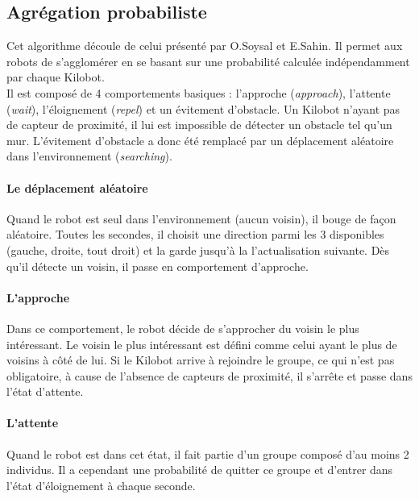 \documentclass[a4paper]{article}
\begin{document}
\subsection{Agrégation probabiliste}

Cet algorithme découle de celui présenté par O.Soysal et E.Sahin. \cite{soysal_probabilistic_2005} Il permet aux robots de s'agglomérer en se basant sur une probabilité calculée indépendamment par chaque Kilobot.\\

Il est composé de 4 comportements basiques : l'approche
(\textit{approach}), l'attente
(\textit{wait}), l'éloignement 
(\textit{repel}) et un évitement d'obstacle.
Un Kilobot n'ayant pas de capteur de proximité, il lui est impossible de détecter un obstacle tel qu'un mur. L'évitement d'obstacle a donc été remplacé par un déplacement aléatoire dans l'environnement (\textit{searching}).
\paragraph{Le déplacement aléatoire} Quand le robot est seul dans l'environnement (aucun voisin), il bouge de façon aléatoire. Toutes les secondes, il choisit une direction parmi les 3 disponibles (gauche, droite, tout droit) et la garde jusqu'à la l'actualisation suivante. Dès qu'il détecte un voisin, il passe en comportement d'approche.
\paragraph{L'approche}Dans ce comportement, le robot décide de s'approcher du voisin le plus intéressant. Le voisin le plus intéressant est défini comme celui ayant le plus de voisins à côté de lui. Si le Kilobot arrive à rejoindre le groupe, ce qui n'est pas obligatoire, à cause de l'absence de capteurs de proximité, il s'arrête et passe dans l'état d'attente.
\paragraph{L'attente} Quand le robot est dans cet état, il fait partie d'un groupe composé d'au moins 2 individus. Il a cependant une probabilité de quitter ce groupe et d'entrer dans l'état d'éloignement à chaque seconde.
\end{document}
